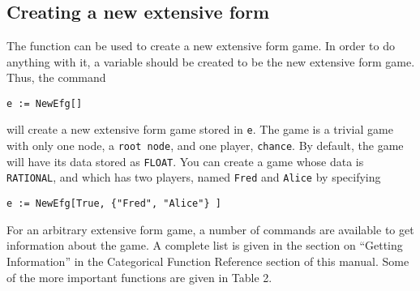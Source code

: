 \section{}

\subsection{Creating a new extensive form}

The function  can be used to create a new extensive form
game.  In order to do anything with it, a variable should be created
to be the new extensive form game.  Thus, the command

\begin{verbatim}
e := NewEfg[]
\end{verbatim}

\noindent will create a new extensive form game stored in \verb+e+.
The game is a trivial game with only one node, a \verb+root node+, and
one player, \verb+chance+.  By default, the game will have its data
stored as \verb+FLOAT+.  You can create a game whose data is
\verb+RATIONAL+, and which has two players, named \verb+Fred+ and
\verb+Alice+ by specifying


\begin{verbatim}
e := NewEfg[True, {"Fred", "Alice"} ]
\end{verbatim}

For an arbitrary extensive form game, a number of commands are
available to get information about the game.  A complete list is given
in the section on ``Getting Information'' in the Categorical Function
Reference section of this manual.  Some of the more important
functions are given in Table 2.  

